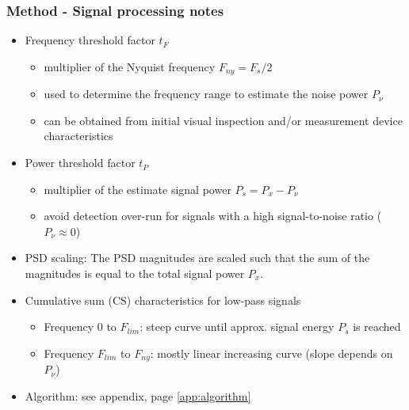 \documentclass[11pt,aspectratio=169]{beamer}
\begin{document}
	\begin{frame}
		\frametitle{Method - Signal processing notes}
		\begin{itemize}
			\item \textcolor{RIPtitlecol}{Frequency threshold factor $t_F$}
			\begin{itemize}
				\item multiplier of the Nyquist frequency $F_{ny} = F_s / 2$
				\item used to determine the frequency range to estimate the noise power $P_{\nu}$
				\item can be obtained from initial visual inspection and/or measurement device characteristics
			\end{itemize}
			\item \textcolor{RIPtitlecol}{Power threshold factor $t_P$}
			\begin{itemize}
				\item multiplier of the estimate signal power $P_s = P_x - P_{\nu}$
				\item avoid detection over-run for signals with a high signal-to-noise ratio ($P_{\nu} \approx 0$)
			\end{itemize}
			\item \textcolor{RIPtitlecol}{PSD scaling:} The PSD magnitudes are scaled such that the sum of the magnitudes is equal to the total signal power $P_x$.
			\item \textcolor{RIPtitlecol}{Cumulative sum (CS) characteristics for low-pass signals}
			\begin{itemize}
				\item Frequency 0 to $F_{lim}$: steep curve until approx. signal energy $P_s$ is reached
				\item Frequency $F_{lim}$ to $F_{ny}$: mostly linear increasing curve (slope depends on $P_{\nu}$)
			\end{itemize}
			\item \textcolor{RIPtitlecol}{Algorithm:} see appendix, page \ref{app:algorithm}
		\end{itemize}	
	\end{frame}
\end{document}
